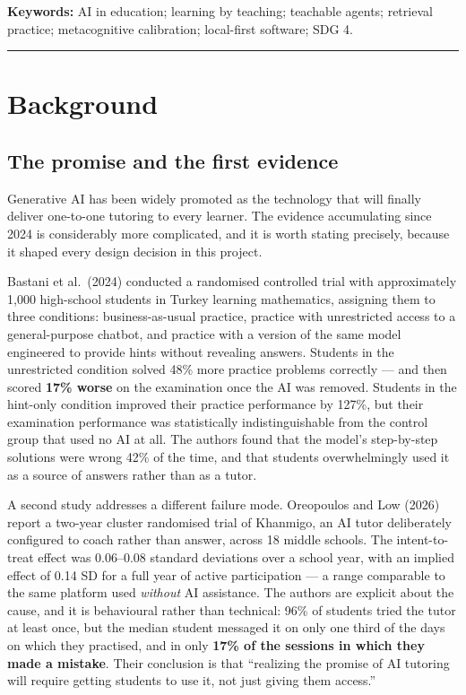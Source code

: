 \documentclass[11pt,a4paper]{article}
\begin{document}
\textbf{Keywords:} AI in education; learning by teaching; teachable agents; retrieval
practice; metacognitive calibration; local-first software; SDG 4.

\vspace{4pt}
\hrule

\section{Background}

\subsection{The promise and the first evidence}

Generative AI has been widely promoted as the technology that will finally deliver
one-to-one tutoring to every learner. The evidence accumulating since 2024 is considerably
more complicated, and it is worth stating precisely, because it shaped every design decision
in this project.

Bastani et al.\ (2024) conducted a randomised controlled trial with approximately 1{,}000
high-school students in Turkey learning mathematics, assigning them to three conditions:
business-as-usual practice, practice with unrestricted access to a general-purpose chatbot,
and practice with a version of the same model engineered to provide hints without revealing
answers. Students in the unrestricted condition solved 48\% more practice problems correctly
--- and then scored \textbf{17\% worse} on the examination once the AI was removed. Students
in the hint-only condition improved their practice performance by 127\%, but their
examination performance was statistically indistinguishable from the control group that
used no AI at all. The authors found that the model's step-by-step solutions were wrong 42\%
of the time, and that students overwhelmingly used it as a source of answers rather than as
a tutor.

A second study addresses a different failure mode. Oreopoulos and Low (2026) report a
two-year cluster randomised trial of Khanmigo, an AI tutor deliberately configured to coach
rather than answer, across 18 middle schools. The intent-to-treat effect was 0.06--0.08
standard deviations over a school year, with an implied effect of 0.14 SD for a full year of
active participation --- a range comparable to the same platform used \emph{without} AI
assistance. The authors are explicit about the cause, and it is behavioural rather than
technical: 96\% of students tried the tutor at least once, but the median student messaged it
on only one third of the days on which they practised, and in only \textbf{17\% of the
sessions in which they made a mistake}. Their conclusion is that ``realizing the promise of
AI tutoring will require getting students to use it, not just giving them access.''
\end{document}
